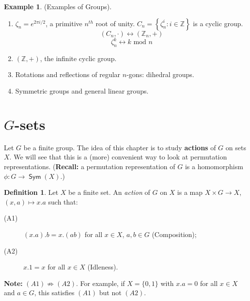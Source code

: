 \documentclass[12pt]{amsart}
\theoremstyle{definition}
\newtheorem{example}[theorem]{Example}
\newtheorem{definition}[theorem]{Definition}
\DeclareMathOperator{\Sym}{\mathsf{Sym}}
\begin{document}
\begin{example}(Examples of Groups).
\begin{enumerate}
\item $\zeta_{n} = e^{2 \pi i / 2}$, a primitive $n^{th}$ root of unity.
$C_{n} = \left\{ \zeta_{n}^{i} : i \in \mathbb{Z} \right\}$ is a cyclic group.
$$\left( C_{n}, \cdot \right) \longleftrightarrow \left( \mathbb{Z}_{n}, + \right)$$
$$\zeta_{n}^{k} \longleftrightarrow k \text{ mod } n$$
\item$\left( \mathbb{Z}, + \right)$, the infinite cyclic group.
\item Rotations and reflections of regular $n$-gons: dihedral groups.
\item Symmetric groups and general linear groups.
\end{enumerate}
\end{example}

\section{$G$-sets}
\label{sec:G-sets}
Let $G$ be a finite group.  The idea of this chapter is to study \textbf{actions} of $G$ on sets $X$.  We will see that this is a (more) convenient way to look at permutation representations.  (\textbf{Recall:} a permutation representation of $G$ is a homomorphism $\phi:G\rightarrow \Sym(X)$.)

\begin{definition}
Let $X$ be a finite set.  An \emph{action} of $G$ on $X$ is a map $X\times G\rightarrow X$, $(x, a)\mapsto x.a$ such that:
\begin{description}
\item[(A1)] $(x.a).b=x.(ab)$ for all $x\in X$, $a, b\in G$ (Composition);
\item[(A2)] $x.1=x$ for all $x\in X$ (Idleness).
\end{description}
\end{definition}

\textbf{Note:} $(A1)\nRightarrow(A2).$  For example, if $X=\{0, 1\}$ with $x.a=0$ for all $x\in X$ and $a\in G$, this satisfies $(A1)$ but not $(A2)$.
\end{document}
